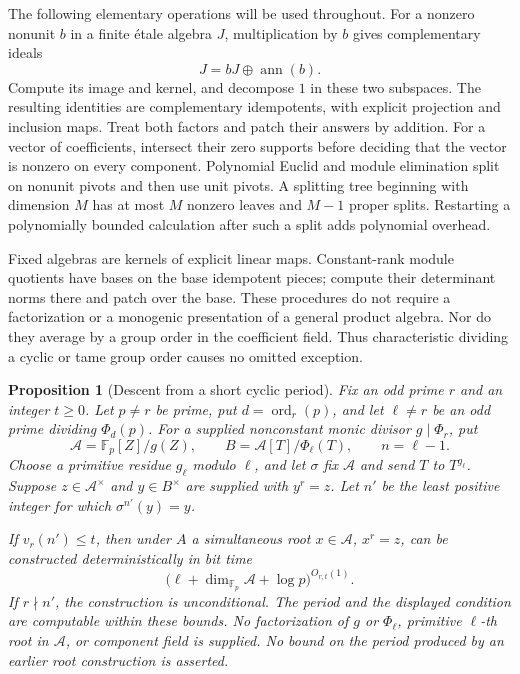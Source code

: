 \documentclass[11pt]{article}
\newtheorem{proposition}[theorem]{Proposition}
\theoremstyle{definition}
\theoremstyle{remark}
\begin{document}
The following elementary operations will be used throughout.
For a nonzero nonunit \(b\) in a finite \'{e}tale algebra \(J\),
multiplication by \(b\) gives complementary ideals
\[
                    J=bJ\oplus\operatorname{ann}(b).
\]
Compute its image and kernel, and decompose \(1\) in these two
subspaces.  The resulting identities are complementary idempotents,
with explicit projection and inclusion maps.  Treat both factors and
patch their answers by addition.  For a vector of coefficients,
intersect their zero supports before deciding that the vector is
nonzero on every component.  Polynomial Euclid and module elimination
split on nonunit pivots and then use unit pivots.  A splitting tree
beginning with dimension \(M\) has at most \(M\) nonzero leaves and
\(M-1\) proper splits.  Restarting a polynomially bounded calculation
after such a split adds polynomial overhead.

Fixed algebras are kernels of explicit linear maps.  Constant-rank
module quotients have bases on the base idempotent pieces; compute their
determinant norms there and patch over the base.  These procedures do
not require a factorization or a monogenic presentation of a general
product algebra.  Nor do they average by a group order in the
coefficient field.  Thus characteristic dividing a cyclic or tame
group order causes no omitted exception.

\begin{proposition}[Descent from a short cyclic period]
\label{prop:short-cyclic-period}
Fix an odd prime \(r\) and an integer \(t\geq0\).
Let \(p\ne r\) be prime, put \(d=\operatorname{ord}_r(p)\), and let
\(\ell\ne r\) be an odd prime dividing \(\Phi_d(p)\).
For a supplied nonconstant monic divisor \(g\mid\Phi_r\), put
\[
 \mathcal A=\mathbb F_p[Z]/g(Z),\qquad
 B=\mathcal A[T]/\Phi_\ell(T),\qquad n=\ell-1.
\]
Choose a primitive residue \(g_\ell\) modulo \(\ell\), and let
\(\sigma\) fix \(\mathcal A\) and send \(T\) to \(T^{g_\ell}\).
Suppose \(z\in\mathcal A^\times\) and \(y\in B^\times\) are supplied
with \(y^r=z\).  Let \(n'\) be the least positive integer for which
\(\sigma^{n'}(y)=y\).

If \(v_r(n')\leq t\), then under \(A\) a simultaneous root
\(x\in\mathcal A\), \(x^r=z\), can be constructed deterministically
in bit time
\[
       \bigl(\ell+\dim_{\mathbb F_p}\mathcal A+\log p\bigr)
                          ^{O_{r,t}(1)}.
\]
If \(r\nmid n'\), the construction is unconditional.
The period and the displayed condition are computable within these
bounds.  No factorization of \(g\) or \(\Phi_\ell\), primitive
\(\ell\)-th root in \(\mathcal A\), or component field is supplied.
No bound on the period produced by an earlier root construction is
asserted.
\end{proposition}
\end{document}
